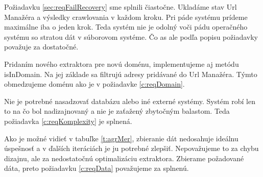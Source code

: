Požiadavku \ref{sec:reqFailRecovery} sme splnili čiastočne. Ukladáme stav Url Manažéra a výsledky crawlovania v každom kroku. Pri páde systému prídeme maximálne iba o jeden krok. Teda systém nie je odolný voči pádu operačného systému so stratou dát v súborovom systéme. Čo as ale podľa popisu požiadavky považuje za dostatočné. 

Pridaním nového extraktora pre novú doménu, implementujeme aj metódu isInDomain. Na jej základe sa filtrujú adresy pridávané do Url Manažéra. Týmto obmedzujeme doménu ako je v požiadavke \ref{c:reqDomain}.

Nie je potrebné nasadzovať databázu alebo iné externé systémy. Systém robí len to na čo bol nadizajnovaný a nie je zaťažený zbytočným balastom. Teda požiadavka \ref{c:reqKomplexity} je splnená. 

Ako je možné vidieť v tabuľke \ref{t:agrMer}, zbieranie dát nedosahuje ideálnu úspešnosť a v ďalších iteráciách je ju potrebné zlepšiť. Nepovažujeme to za chybu dizajnu, ale za nedostatočnú optimalizáciu extraktora. Zbierame požadované dáta, preto požiadavku \ref{c:reqData} považujeme za splnenú. 
